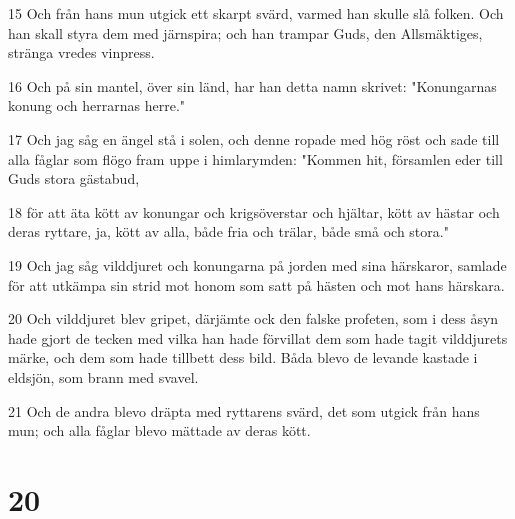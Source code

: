\par 15 Och från hans mun utgick ett skarpt svärd, varmed han skulle slå folken. Och han skall styra dem med järnspira; och han trampar Guds, den Allsmäktiges, stränga vredes vinpress.
\par 16 Och på sin mantel, över sin länd, har han detta namn skrivet: "Konungarnas konung och herrarnas herre."
\par 17 Och jag såg en ängel stå i solen, och denne ropade med hög röst och sade till alla fåglar som flögo fram uppe i himlarymden: "Kommen hit, församlen eder till Guds stora gästabud,
\par 18 för att äta kött av konungar och krigsöverstar och hjältar, kött av hästar och deras ryttare, ja, kött av alla, både fria och trälar, både små och stora."
\par 19 Och jag såg vilddjuret och konungarna på jorden med sina härskaror, samlade för att utkämpa sin strid mot honom som satt på hästen och mot hans härskara.
\par 20 Och vilddjuret blev gripet, därjämte ock den falske profeten, som i dess åsyn hade gjort de tecken med vilka han hade förvillat dem som hade tagit vilddjurets märke, och dem som hade tillbett dess bild. Båda blevo de levande kastade i eldsjön, som brann med svavel.
\par 21 Och de andra blevo dräpta med ryttarens svärd, det som utgick från hans mun; och alla fåglar blevo mättade av deras kött.

\chapter{20}

